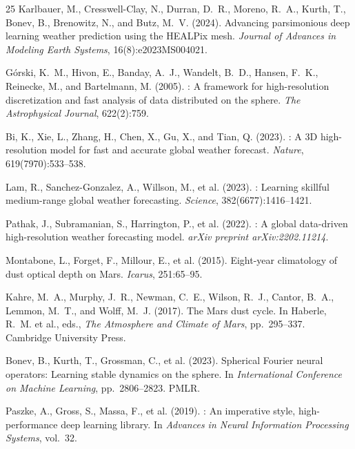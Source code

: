 \documentclass[11pt, a4paper, twocolumn]{article}
\begin{document}
\begin{thebibliography}{25}
Karlbauer, M., Cresswell-Clay, N., Durran, D.~R., Moreno, R.~A., Kurth, T., Bonev, B., Brenowitz, N., and Butz, M.~V. (2024).
\newblock Advancing parsimonious deep learning weather prediction using the {HEALPix} mesh.
\newblock \textit{Journal of Advances in Modeling Earth Systems}, 16(8):e2023MS004021.

G\'{o}rski, K.~M., Hivon, E., Banday, A.~J., Wandelt, B.~D., Hansen, F.~K., Reinecke, M., and Bartelmann, M. (2005).
: A framework for high-resolution discretization and fast analysis of data distributed on the sphere.
\newblock \textit{The Astrophysical Journal}, 622(2):759.

Bi, K., Xie, L., Zhang, H., Chen, X., Gu, X., and Tian, Q. (2023).
: A 3{D} high-resolution model for fast and accurate global weather forecast.
\newblock \textit{Nature}, 619(7970):533--538.

Lam, R., Sanchez-Gonzalez, A., Willson, M., et al. (2023).
: Learning skillful medium-range global weather forecasting.
\newblock \textit{Science}, 382(6677):1416--1421.

Pathak, J., Subramanian, S., Harrington, P., et al. (2022).
: A global data-driven high-resolution weather forecasting model.
\newblock \textit{arXiv preprint arXiv:2202.11214}.

Montabone, L., Forget, F., Millour, E., et al. (2015).
\newblock Eight-year climatology of dust optical depth on {M}ars.
\newblock \textit{Icarus}, 251:65--95.

Kahre, M.~A., Murphy, J.~R., Newman, C.~E., Wilson, R.~J., Cantor, B.~A., Lemmon, M.~T., and Wolff, M.~J. (2017).
\newblock The {M}ars dust cycle.
\newblock In Haberle, R.~M. et al., eds., \textit{The Atmosphere and Climate of Mars}, pp.\ 295--337. Cambridge University Press.

Bonev, B., Kurth, T., Grossman, C., et al. (2023).
\newblock Spherical {F}ourier neural operators: Learning stable dynamics on the sphere.
\newblock In \textit{International Conference on Machine Learning}, pp.\ 2806--2823. PMLR.

Paszke, A., Gross, S., Massa, F., et al. (2019).
: An imperative style, high-performance deep learning library.
\newblock In \textit{Advances in Neural Information Processing Systems}, vol.\ 32.


\end{thebibliography}
\end{document}
